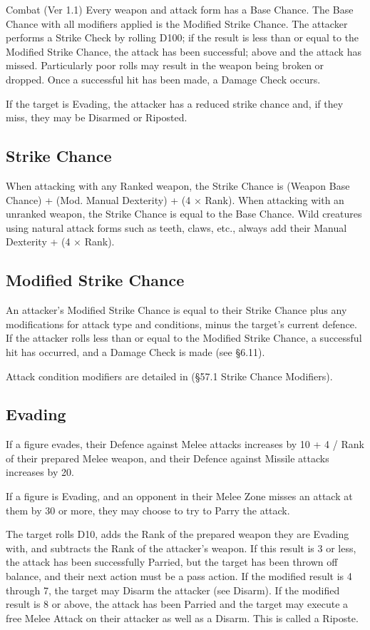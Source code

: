 \begin{Chapter}{Combat (Ver 1.1)}
Every weapon and attack form has a Base Chance.  The Base Chance with
all modifiers applied is the Modified Strike Chance.  The attacker
performs a Strike Check by rolling D100; if the result is less than or
equal to the Modified Strike Chance, the attack has been successful;
above and the attack has missed. Particularly poor rolls may result in
the weapon being broken or dropped. Once a successful hit has been
made, a Damage Check occurs.

If the target is Evading, the attacker has a reduced strike chance
and, if they miss, they may be Disarmed or Riposted.

\subsection{Strike Chance}

When attacking with any Ranked weapon, the Strike Chance is (Weapon
Base Chance) + (Mod.  Manual Dexterity) + (4 × Rank).  When attacking
with an unranked weapon, the Strike Chance is equal to the Base
Chance.  Wild creatures using natural attack forms such as teeth,
claws, etc., always add their Manual Dexterity + (4 × Rank).

\subsection{Modified Strike Chance}

An attacker’s Modified Strike Chance is equal to their Strike Chance
plus any modifications for attack type and conditions, minus the
target’s current defence. If the attacker rolls less than or equal to
the Modified Strike Chance, a successful hit has occurred, and a
Damage Check is made (see §6.11).

Attack condition modifiers are detailed in (§57.1 Strike Chance
Modifiers).

\subsection{Evading}

If a figure evades, their Defence against Melee attacks increases by
10 + 4 / Rank of their prepared Melee weapon, and their Defence
against Missile attacks increases by 20.

If a figure is Evading, and an opponent in their Melee Zone misses an
attack at them by 30 or more, they may choose to try to Parry the
attack.

The target rolls D10, adds the Rank of the prepared weapon they are
Evading with, and subtracts the Rank of the attacker’s weapon. If this
result is 3 or less, the attack has been successfully Parried, but the
target has been thrown off balance, and their next action must be a
pass action.  If the modified result is 4 through 7, the target may
Disarm the attacker (see Disarm). If the modified result is 8 or
above, the attack has been Parried and the target may execute a free
Melee Attack on their attacker as well as a Disarm. This is called a
Riposte.


\end{Chapter}
